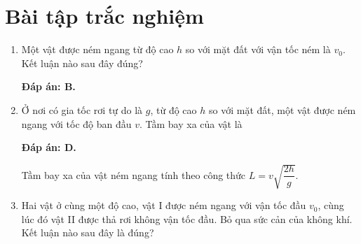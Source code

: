 \let\lesson\undefined
\newcommand{\lesson}{\phantomlesson{Bài 9.}}
\setcounter{section}{2}
\section{Bài tập trắc nghiệm}
\begin{enumerate}[label=\bfseries Câu \arabic*:]
	\item {}
	
	
	{Một vật được ném ngang từ độ cao $h$ so với mặt đất với vận tốc ném là $v_0$. Kết luận nào sau đây đúng?
	}
	
	\hideall
	{	\textbf{Đáp án: B.}
	}
	
	\item {}
	
	
	{Ở nơi có gia tốc rơi tự do là $g$, từ độ cao $h$ so với mặt đất, một vật được ném ngang với tốc độ ban đầu $v$. Tầm bay xa của vật là
	}
	
	\hideall
	{	\textbf{Đáp án: D.}
		
		Tầm bay xa của vật ném ngang tính theo công thức $L=v\sqrt{\dfrac{2h}{g}}$.
	}
	\item {}
	
	
	{Hai vật ở cùng một độ cao, vật I được ném ngang với vận tốc đầu $v_0$, cùng lúc đó vật II được thả rơi không vận tốc đầu. Bỏ qua sức cản của không khí. Kết luận nào sau đây là đúng?
	}
	

\end{enumerate}
